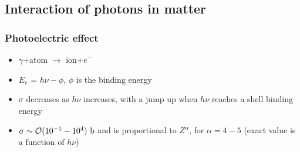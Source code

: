 \subsection{Interaction of photons in matter}

\subsubsection{Photoelectric effect}
\begin{itemize}
  \item $\gamma$+atom $\rightarrow$ ion+$e^{-}$
  \item $E_e$ = $h\nu - \phi$, $\phi$ is the binding energy
  \item $\sigma$ decreases as $h\nu$ increases, with a jump up when $h\nu$ reaches a shell binding energy
  \item $\sigma\sim \mathcal{O}(10^{-1}-10^{4})~\text{b}$ and is proportional to $Z^\alpha$, for $\alpha=4-5$ (exact value is a function of $h\nu$)
\end{itemize}

